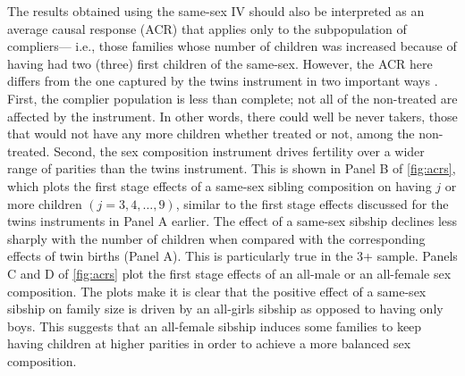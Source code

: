 The results obtained using the same-sex IV should also be interpreted as an average causal response (ACR) that applies only to the subpopulation of compliers--- i.e., those families whose number of children was increased because of having had two (three) first children of the same-sex. However, the ACR here differs from the one captured by the twins instrument in two important ways \parencite{angrist_multiple_2010}. First, the complier population is less than complete; not all of the non-treated are affected by the instrument. In other words, there could well be never takers, those that would not have any more children whether treated or not, among the non-treated. Second, the sex composition instrument drives fertility over a wider range of parities than the twins instrument. This is shown in Panel B of \autoref{fig:acrs}, which plots the first stage effects of a same-sex sibling composition on having $ j $ or more children $ (j = 3, 4, \dots, 9) $, similar to the first stage effects discussed for the twins instruments in Panel A earlier. The effect of a same-sex sibship declines less sharply with the number of children when compared with the corresponding effects of twin births (Panel A). This is particularly true in the 3+ sample. Panels C and D of \autoref{fig:acrs} plot the first stage effects of an all-male or an all-female sex composition. The plots make it is clear that the positive effect of a same-sex sibship on family size is driven by an all-girls sibship as opposed to having only boys. This suggests that an all-female sibship induces some families to keep having children at higher parities in order to achieve a more balanced sex composition. 


